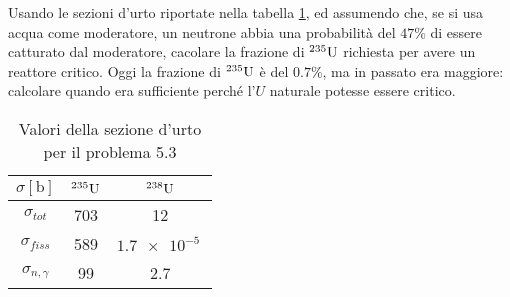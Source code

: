 \documentclass[../main.tex]{subfile}
\begin{document}
	\begin{ese}[5.3]
		Usando le sezioni d'urto riportate nella tabella \ref{tbl:CrossSectionData}, ed assumendo che, se si usa acqua come moderatore, un neutrone abbia una probabilità del $47\%$ di essere catturato dal moderatore, cacolare la frazione di $ ^{235}\mathrm{U} $ richiesta per avere un reattore critico. Oggi la frazione di $ ^{235}\mathrm{U} $ è del $ 0.7\% $, ma in passato era maggiore: calcolare quando era sufficiente perché l'$ U $ naturale potesse essere critico.
		\begin{table}[]
			\centering
			\caption{Valori della sezione d'urto per il problema 5.3}
			\label{tbl:CrossSectionData}
			\begin{tabular}{c|cc}
				$\sigma [\si{\barn}]$ & $^{235}\mathrm{U}$
				 & $^{238}\mathrm{U}$    \\ \hline
				$\sigma_{tot}$                            & 703                                  & 12                  \\
				$\sigma_{fiss}$                           & 589                                  & $\SI{1.7e-5}{}$ \\
				$\sigma_{n,\gamma}$               & 99                                   & 2.7                
			\end{tabular}
		\end{table}
	\end{ese}
\end{document}
